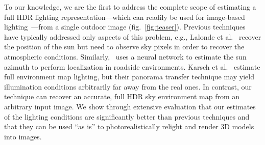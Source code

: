To our knowledge, we are the first to address the complete scope of estimating a full HDR lighting representation---which can readily be used for image-based lighting~\cite{Debevec1998}---from a single outdoor image (fig.~\ref{fig:teaser}). Previous techniques have typically addressed only aspects of this problem, e.g., Lalonde et al.~\cite{lalonde-ijcv-12} recover the position of the sun but need to observe sky pixels in order to recover the atmospheric conditions. Similarly,~\cite{Ma2017} uses a neural network to estimate the sun azimuth to perform localization in roadside environments. Karsch et al.~\cite{karsch2014automatic} estimate full environment map lighting, but their panorama transfer technique may yield illumination conditions arbitrarily far away from the real ones. In contrast, our technique can recover an accurate, full HDR sky environment map from an arbitrary input image. We show through extensive evaluation that our estimates of the lighting conditions are significantly better than previous techniques and that they can be used ``as is'' to photorealistically relight and render 3D models into images.    



